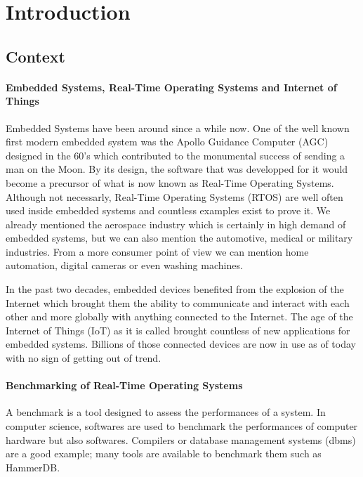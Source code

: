 \chapter*{Introduction}
%
%
\section*{Context}

\subsubsection*{Embedded Systems, Real-Time Operating Systems and Internet of Things}

Embedded Systems have been around since a while now.
One of the well known first modern embedded system was the Apollo Guidance Computer (AGC) designed in the 60's
    which contributed to the monumental success of sending a man on the Moon.
By its design, the software that was developped for it would become a precursor of what is now known as Real-Time Operating Systems.
Although not necessarly, Real-Time Operating Systems (RTOS) are well often used inside embedded systems and countless examples exist to prove it.
We already mentioned the aerospace industry which is certainly in high demand of embedded systems, 
    but we can also mention the automotive, medical or military industries.
From a more consumer point of view we can mention home automation, digital cameras or even washing machines.

In the past two decades, embedded devices benefited from the explosion of the Internet which brought them 
    the ability to communicate and interact with each other and more globally with anything connected to the Internet.
The age of the Internet of Things (IoT) as it is called brought countless of new applications for embedded systems.
Billions of those connected devices are now in use as of today with no sign of getting out of trend.

\subsubsection*{Benchmarking of Real-Time Operating Systems}

A benchmark is a tool designed to assess the performances of a system.
In computer science, softwares are used to benchmark the performances of computer hardware but also softwares.
Compilers or database management systems (dbms) are a good example; many tools are available to benchmark them such as HammerDB.

